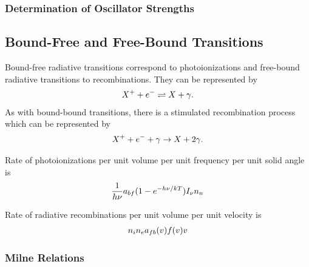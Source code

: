 \subsubsection{Determination of Oscillator Strengths}


\subsection{Bound-Free and Free-Bound Transitions}


Bound-free radiative transitions correspond to
photoionizations and free-bound radiative transitions to
recombinations. They can be represented by
\begin{align}
X^+ + e^- \rightleftharpoons X + \gamma.
\end{align}
As with bound-bound transitions, there is a stimulated
recombination process which can be represented by
\begin{align}
X^+ + e^- + \gamma \rightarrow X + 2\gamma.
\end{align}

Rate of photoionizations per unit volume per unit frequency per unit
solid angle is
\begin{align}
\frac{1}{h\nu} a_{bf} (1 - e^{-h\nu/kT}) I_\nu n_n
\end{align}


Rate of radiative recombinations per unit volume per unit velocity is
\begin{align}
n_i n_e a_{fb}(v) f(v) v
\end{align}

\subsubsection{Milne Relations}


